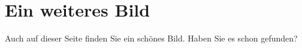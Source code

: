 \documentclass[12pt,a4paper, bibliography=totoc]{scrbook}
\begin{document}
\section{Ein weiteres Bild}
Auch auf dieser Seite finden Sie ein schönes Bild. Haben Sie es schon gefunden?




\nocite{bilderbuch}
\end{document}
